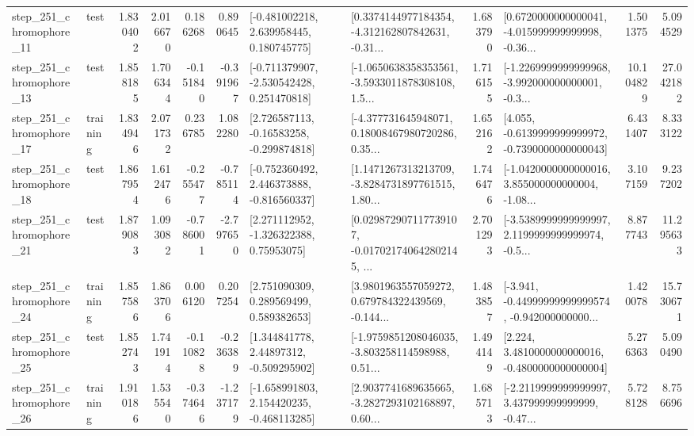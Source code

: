 \begin{tabular}{llrrrrllrlrr}
  step\_251\_chromophore\_11 &      test &      1.830402 &    2.016670 &      0.186268 &  0.890645 &    [-0.481002218, 2.639958445, 0.180745775] &  [0.3374144977184354, -4.312162807842631, -0.31... &       1.683790 &  [0.6720000000000041, -4.015999999999998, -0.36... &            1.501375 &          5.094529 \\
  step\_251\_chromophore\_13 &      test &      1.858185 &    1.706344 &     -0.151840 & -0.391967 &   [-0.711379907, -2.530542428, 0.251470818] &  [-1.0650638358353561, -3.5933011878308108, 1.5... &       1.716155 &  [-1.2269999999999968, -3.992000000000001, -0.3... &           10.104829 &         27.042182 \\
  step\_251\_chromophore\_17 &  training &      1.834946 &    2.071732 &      0.236785 &  1.082280 &    [2.726587113, -0.16583258, -0.299874818] &  [-4.377731645948071, 0.18008467980720286, 0.35... &       1.652162 &  [4.055, -0.6139999999999972, -0.7390000000000043] &            6.431407 &          8.333122 \\
  step\_251\_chromophore\_18 &      test &      1.867954 &    1.612476 &     -0.255477 & -0.785114 &   [-0.752360492, 2.446373888, -0.816560337] &  [1.1471267313213709, -3.8284731897761515, 1.80... &       1.746476 &  [-1.0420000000000016, 3.855000000000004, -1.08... &            3.107159 &          9.237202 \\
  step\_251\_chromophore\_21 &      test &      1.879083 &    1.093082 &     -0.786001 & -2.797650 &     [2.271112952, -1.326322388, 0.75953075] &  [0.029872907117739107, -0.017021740642802145, ... &       2.701293 &  [-3.5389999999999997, 2.1199999999999974, -0.5... &            8.877743 &         11.295633 \\
  step\_251\_chromophore\_24 &  training &      1.857586 &    1.863706 &      0.006120 &  0.207254 &     [2.751090309, 0.289569499, 0.589382653] &  [3.9801963557059272, 0.679784322439569, -0.144... &       1.483857 &  [-3.941, -0.44999999999999574, -0.942000000000... &            1.420078 &         15.730671 \\
  step\_251\_chromophore\_25 &      test &      1.852743 &    1.741914 &     -0.110828 & -0.236389 &     [1.344841778, 2.44897312, -0.509295902] &  [-1.9759851208046035, -3.803258114598988, 0.51... &       1.494149 &   [2.224, 3.4810000000000016, -0.4800000000000004] &            5.276363 &          5.090490 \\
  step\_251\_chromophore\_26 &  training &      1.910186 &    1.535540 &     -0.374646 & -1.237179 &   [-1.658991803, 2.154420235, -0.468113285] &  [2.9037741689635665, -3.2827293102168897, 0.60... &       1.685713 &  [-2.2119999999999997, 3.437999999999999, -0.47... &            5.728128 &          8.756696 \\

\end{tabular}
